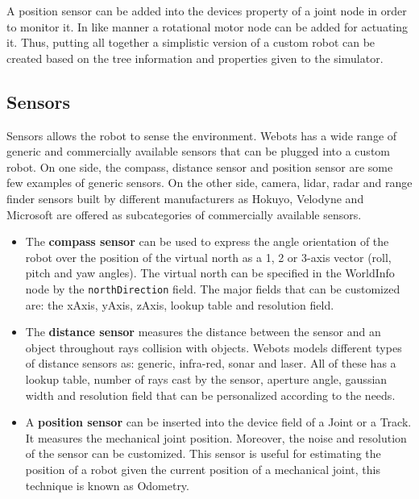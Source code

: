 A position sensor can be added into the devices property of a joint node in order to monitor it. In like manner a rotational motor node can be added for actuating it. Thus, putting all together a simplistic version of a custom robot can be created based on the tree information and properties given to the simulator.

\subsection{Sensors}\label{sec:ch-2:sensors}

Sensors allows the robot to sense the environment. Webots has a wide range of generic and commercially available sensors that can be plugged into a custom robot. On one side, the compass, distance sensor and position sensor are some few examples of generic sensors. On the other side, camera, lidar, radar and range finder sensors built by different manufacturers as Hokuyo, Velodyne and Microsoft are offered as subcategories of commercially available sensors. 

\begin{itemize}
\item{The \textbf{compass sensor} can be used to express the angle orientation of the robot over the position of the virtual north as a 1, 2 or 3-axis vector (roll, pitch and yaw angles). The virtual north can be specified in the WorldInfo node by the \verb|northDirection| field. The major fields that can be customized are: the xAxis, yAxis, zAxis, lookup table and resolution field. }
\item{The \textbf{distance sensor} measures the distance between the sensor and an object throughout rays collision with objects. Webots models different types of distance sensors as: generic, infra-red, sonar and laser. All of these has a lookup table, number of rays cast by the sensor, aperture angle, gaussian width and resolution field that can be personalized according to the needs.}
\item{A \textbf{position sensor} can be inserted into the device field of a Joint or a Track. It measures the mechanical joint position. Moreover, the noise and resolution of the sensor can be customized. This sensor is useful for estimating the position of a robot given the current position of a mechanical joint, this technique is known as Odometry.}
\end{itemize}

